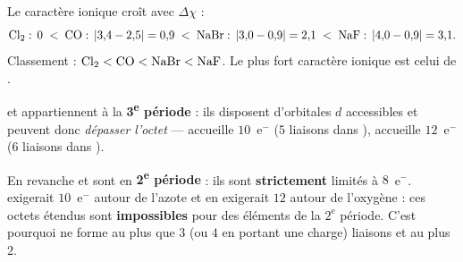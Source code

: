 \documentclass[11pt,a4paper]{article}
\begin{document}
\begin{corrige}
Le caractère ionique croît avec $\Delta\chi$ :
\[ \ce{Cl2}:\,0 \;<\; \ce{CO}:\,|3{,}4-2{,}5| = 0{,}9 \;<\;
   \ce{NaBr}:\,|3{,}0-0{,}9| = 2{,}1 \;<\; \ce{NaF}:\,|4{,}0-0{,}9| = 3{,}1. \]
Classement : $\ce{Cl2} < \ce{CO} < \ce{NaBr} < \ce{NaF}$. Le plus fort caractère ionique est
celui de \textbf{}.
\end{corrige}

\begin{corrige}
 et  appartiennent à la \textbf{3\textsuperscript{e} période} : ils disposent
d'orbitales $d$ accessibles et peuvent donc \emph{dépasser l'octet} —  accueille $10$~e$^-$
($5$ liaisons dans ),  accueille $12$~e$^-$ ($6$ liaisons dans ).

En revanche  et  sont en \textbf{2\textsuperscript{e} période} : ils sont
\textbf{strictement} limités à $8$~e$^-$.  exigerait $10$~e$^-$ autour de l'azote et
 en exigerait $12$ autour de l'oxygène : ces octets étendus sont \textbf{impossibles} pour
des éléments de la $2^{\text{e}}$ période. C'est pourquoi  ne forme au plus que $3$ (ou $4$
en portant une charge) liaisons et  au plus $2$.
\end{corrige}
\end{document}
